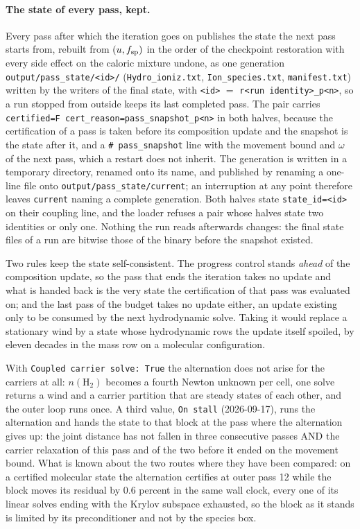 \paragraph{The state of every pass, kept.}
Every pass after which the iteration goes on publishes the state the next pass
starts from, rebuilt from $(u, f_{\rm sp})$ in the order of the checkpoint
restoration with every side effect on the caloric mixture undone, as one
generation \texttt{output/pass\_state/<id>/} (\texttt{Hydro\_ioniz.txt},
\texttt{Ion\_species.txt}, \texttt{manifest.txt}) written by the writers of
the final state, with \texttt{<id>} $=$ \texttt{r<run identity>\_p<n>}, so a
run stopped from outside keeps its last completed pass.  The pair carries
\texttt{certified=F cert\_reason=pass\_snapshot\_p<n>} in both halves,
because the certification of a pass is taken before its composition update
and the snapshot is the state after it, and a \texttt{\# pass\_snapshot} line
with the movement bound and $\omega$ of the next pass, which a restart does
not inherit.  The generation is written in a temporary directory, renamed
onto its name, and published by renaming a one-line file onto
\texttt{output/pass\_state/current}; an interruption at any point therefore
leaves \texttt{current} naming a complete generation.  Both halves state
\texttt{state\_id=<id>} on their coupling line, and the loader refuses a pair
whose halves state two identities or only one.
Nothing the run reads afterwards changes: the final state files of a run are
bitwise those of the binary before the snapshot existed.

Two rules keep the state self-consistent.  The progress control stands
\emph{ahead} of the composition update, so the pass that ends the iteration
takes no update and what is handed back is the very state the certification of
that pass was evaluated on; and the last pass of the budget takes no update
either, an update existing only to be consumed by the next hydrodynamic solve.
Taking it would replace a stationary wind by a state whose hydrodynamic rows
the update itself spoiled, by eleven decades in the mass row on a molecular
configuration.

With \texttt{Coupled carrier solve: True} the alternation does not arise for
the carriers at all: $n(\mathrm{H_2})$ becomes a fourth Newton unknown per
cell, one solve returns a wind and a carrier partition that are steady states
of each other, and the outer loop runs once.  A third value,
\texttt{On stall} (2026-09-17), runs the alternation and hands the state to
that block at the pass where the alternation gives up: the joint distance has
not fallen in three consecutive passes AND the carrier relaxation of this pass
and of the two before it ended on the movement bound.  What is known about the
two routes where they have been compared: on a certified molecular state the
alternation certifies at outer pass 12 while the block moves its residual by
0.6 percent in the same wall clock, every one of its linear solves ending with
the Krylov subspace exhausted, so the block as it stands is limited by its
preconditioner and not by the species box.

